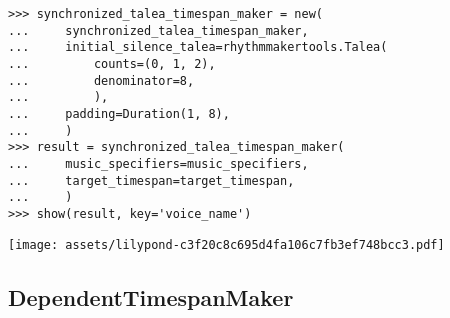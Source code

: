 \begin{comment}
<abjad>
synchronized_talea_timespan_maker = new(
    synchronized_talea_timespan_maker,
    initial_silence_talea=rhythmmakertools.Talea(
        counts=(0, 1, 2),
        denominator=8,
        ),
    padding=Duration(1, 8),
    )
result = synchronized_talea_timespan_maker(
    music_specifiers=music_specifiers,
    target_timespan=target_timespan,
    )
show(result, key='voice_name')
</abjad>
\end{comment}

\begin{singlespacing}
\vspace{-0.5\baselineskip}
\begin{lstlisting}
>>> synchronized_talea_timespan_maker = new(
...     synchronized_talea_timespan_maker,
...     initial_silence_talea=rhythmmakertools.Talea(
...         counts=(0, 1, 2),
...         denominator=8,
...         ),
...     padding=Duration(1, 8),
...     )
>>> result = synchronized_talea_timespan_maker(
...     music_specifiers=music_specifiers,
...     target_timespan=target_timespan,
...     )
>>> show(result, key='voice_name')
\end{lstlisting}
\noindent\texttt{[image: assets/lilypond-c3f20c8c695d4fa106c7fb3ef748bcc3.pdf]}
\end{singlespacing}


\subsection{DependentTimespanMaker} %

\begin{comment}
<abjad>
timespan_inventory = timespantools.TimespanInventory([
    consort.PerformedTimespan(0, 10, voice_name='Voice 1'),
    consort.PerformedTimespan(10, 20, voice_name='Voice 1'),
    consort.PerformedTimespan(25, 30, voice_name='Voice 1'),
    consort.PerformedTimespan(50, 60, voice_name='Voice 1'),
    consort.PerformedTimespan(0, 10, voice_name='Voice 2'),
    consort.PerformedTimespan(15, 35, voice_name='Voice 2'),
    consort.PerformedTimespan(40, 45, voice_name='Voice 2'),
    consort.PerformedTimespan(45, 75, voice_name='Voice 2'),
    ])
show(timespan_inventory, key='voice_name')
</abjad>
\end{comment}

